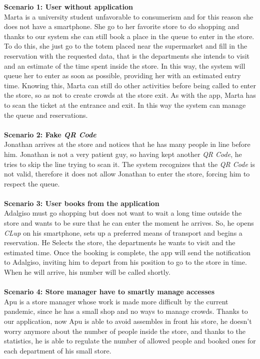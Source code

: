 \documentclass{article}
\begin{document}
			{\bfseries Scenario 1: User without application} \\
			Marta is a university student unfavorable to consumerism and for this reason she does not have a smartphone. She go to her favorite store to do shopping and thanks to our system she can still book a place in the queue to enter in the store. To do this, she just go to the totem placed near the supermarket and fill in the reservation with the requested data, that is the departments she intends to visit and an estimate of the time spent inside the store. In this way, the system will queue her to enter as soon as possible, providing her with an estimated entry time. Knowing this, Marta can still do other activities before being called to enter the store, so as not to create crowds at the store exit. As with the app, Marta has to scan the ticket at the  entrance and exit. In this way the system can manage the queue and reservations. \\ \\
			{\bfseries Scenario 2: Fake \emph{QR Code}} \\
			Jonathan arrives at the store and notices that he has many people in line before him. Jonathan is not a very patient guy, so having kept another \emph{QR Code}, he tries to skip the line trying to scan it. The system recognizes that the \emph{QR Code} is not valid, therefore it does not allow Jonathan to enter the store, forcing him to respect the queue. \\ \\
			{\bfseries Scenario 3: User books from the application} \\
			Adalgiso must go shopping but does not want to wait a long time outside the store and wants to be sure that he can enter the moment he arrives. So, he opens \emph{CLup} on his smartphone, sets up a preferred means of transport and begins a reservation. He Selects the store, the departments he wants to visit and the estimated time. Once the booking is complete, the app will send the notification to Adalgiso, inviting him to depart from his position to go to the store in time. When he will arrive, his number will be called shortly.\\ \\
			{\bfseries Scenario 4: Store manager have to smartly manage accesses} \\
			Apu is a store manager whose work is made more difficult by the current pandemic, since he has a small shop and no ways to manage crowds. Thanks to our application, now Apu is able to avoid assembles in front his store, he doesn't worry anymore about the number of people inside the store, and thanks to the statistics, he is able to regulate the number of allowed people and booked ones for each department of his small store.
		\newpage
\end{document}
